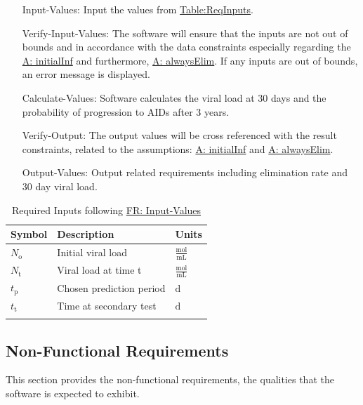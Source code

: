 \documentclass[12pt]{article}
\begin{document}
\begin{itemize}
\item[Input-Values:\phantomsection\label{inputValues}]{Input the values from \hyperref[Table:ReqInputs]{Table:ReqInputs}.}
\item[Verify-Input-Values:\phantomsection\label{verifyInput}]{The software will ensure that the inputs are not   out of bounds and in accordance with the data constraints especially regarding the \hyperref[initialInf]{A: initialInf} and furthermore, \hyperref[alwaysElim]{A: alwaysElim}. If any inputs are out of bounds, an error message is displayed.}
\item[Calculate-Values:\phantomsection\label{calcValues}]{Software calculates the viral load at 30 days and  the probability of progression to AIDs after 3 years.}
\item[Verify-Output:\phantomsection\label{verifyOutput}]{The output values will be cross referenced with  the result constraints, related to the assumptions: \hyperref[initialInf]{A: initialInf} and \hyperref[alwaysElim]{A: alwaysElim}.}
\item[Output-Values:\phantomsection\label{outputValues}]{Output related requirements including elimination rate and 30 day viral load.}
\end{itemize}
\begin{longtable}{l l l}
\toprule
\textbf{Symbol} & \textbf{Description} & \textbf{Units}
\\
\midrule
\endhead
${N_{\text{o}}}$ & Initial viral load & $\frac{\text{mol}}{\text{mL}}$
\\
${N_{\text{t}}}$ & Viral load at time t & $\frac{\text{mol}}{\text{mL}}$
\\
${t_{\text{p}}}$ & Chosen prediction period & ${\text{d}}$
\\
${t_{\text{t}}}$ & Time at secondary test & ${\text{d}}$
\\
\bottomrule
\caption{Required Inputs following \hyperref[inputValues]{FR: Input-Values}}
\label{Table:ReqInputs}
\end{longtable}
\subsection{Non-Functional Requirements}
\label{Sec:NFRs}
This section provides the non-functional requirements, the qualities that the software is expected to exhibit.
\end{document}
